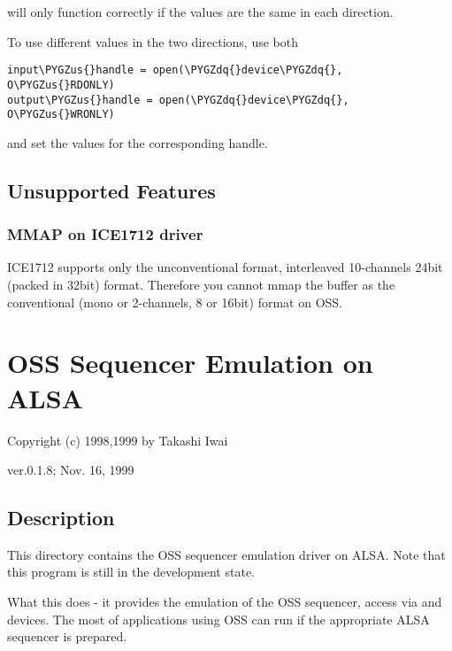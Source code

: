 \documentclass[a4paper,8pt,english]{sphinxmanual}
\def\PYGZus{\char`\_}
\def\PYGZdq{\char`\"}
\begin{document}
will only function correctly if the values are the same in each direction.

To use different values in the two directions, use both

\begin{Verbatim}[commandchars=\\\{\}]
input\PYGZus{}handle = open(\PYGZdq{}device\PYGZdq{}, O\PYGZus{}RDONLY)
output\PYGZus{}handle = open(\PYGZdq{}device\PYGZdq{}, O\PYGZus{}WRONLY)
\end{Verbatim}

and set the values for the corresponding handle.


\subsection{Unsupported Features}
\label{sound/designs/oss-emulation:unsupported-features}

\subsubsection{MMAP on ICE1712 driver}
\label{sound/designs/oss-emulation:mmap-on-ice1712-driver}
ICE1712 supports only the unconventional format, interleaved
10-channels 24bit (packed in 32bit) format.  Therefore you cannot mmap
the buffer as the conventional (mono or 2-channels, 8 or 16bit) format
on OSS.


\section{OSS Sequencer Emulation on ALSA}
\label{sound/designs/seq-oss::doc}\label{sound/designs/seq-oss:oss-sequencer-emulation-on-alsa}
Copyright (c) 1998,1999 by Takashi Iwai

ver.0.1.8; Nov. 16, 1999


\subsection{Description}
\label{sound/designs/seq-oss:description}
This directory contains the OSS sequencer emulation driver on ALSA. Note
that this program is still in the development state.

What this does - it provides the emulation of the OSS sequencer, access
via  and  devices.
The most of applications using OSS can run if the appropriate ALSA
sequencer is prepared.
\end{document}
